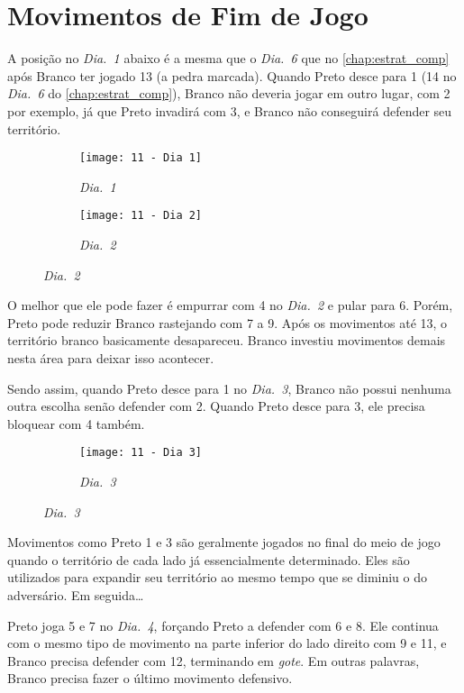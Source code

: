 \chapter{Movimentos de Fim de Jogo}

A posição no \emph{Dia.\@~1} abaixo é a mesma que o \emph{Dia.\@~6} que no \autoref{chap:estrat_comp} após Branco ter jogado 13 (a pedra marcada). Quando Preto desce para 1 (14 no \emph{Dia.\@~6} do \autoref{chap:estrat_comp}), Branco não deveria jogar em outro lugar, com 2 por exemplo, já que Preto invadirá com 3, e Branco não conseguirá defender seu território.

\begin{figure}[h!]
    \centering
    \begin{subfigure}[t]{.45\textwidth}
        \texttt{[image: 11 - Dia 1]}
        \caption*{\emph{Dia.\@~1}}
    \end{subfigure}
    \hspace{1cm}
    \begin{subfigure}[t]{.45\textwidth}
        \texttt{[image: 11 - Dia 2]}
        \caption*{\emph{Dia.\@~2}}
    \end{subfigure}
\end{figure}

O melhor que ele pode fazer é empurrar com 4 no \emph{Dia.\@~2} e pular para 6. Porém, Preto pode reduzir Branco rastejando com 7 a 9. Após os movimentos até 13, o território branco basicamente desapareceu. Branco investiu movimentos demais nesta área para deixar isso acontecer.

Sendo assim, quando Preto desce para 1 no \emph{Dia.\@~3}, Branco não possui nenhuma outra escolha senão defender com 2. Quando Preto desce para 3, ele precisa bloquear com 4 também.

\begin{figure}[h!]
    \centering
    \begin{subfigure}[t]{.45\textwidth}
        \texttt{[image: 11 - Dia 3]}
        \caption*{\emph{Dia.\@~3}}
    \end{subfigure}
\end{figure}

Movimentos como Preto 1 e 3 são geralmente jogados no final do meio de jogo quando o território de cada lado já essencialmente determinado. Eles são utilizados para expandir seu território ao mesmo tempo que se diminiu o do adversário. Em seguida\ldots

Preto joga 5 e 7 no \emph{Dia.\@~4}, forçando Preto a defender com 6 e 8. Ele continua com o mesmo tipo de movimento na parte inferior do lado direito com 9 e 11, e Branco precisa defender com 12, terminando em \emph{gote}. Em outras palavras, Branco precisa fazer o último movimento defensivo.

